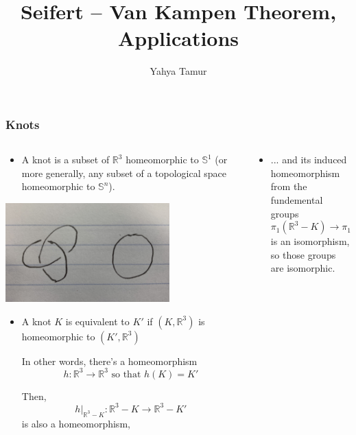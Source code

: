 \documentclass[8pt]{beamer}
\title{Seifert -- Van Kampen Theorem, Applications}
\author{Yahya Tamur}
\begin{document}
  \frame{\titlepage}

  \begin{frame}
    \frametitle{Knots}
    \begin{columns}
      \begin{column}{0.5\textwidth}
        \begin{itemize}
          \item
            A knot is a subset of $\mathbb{R}^3$ homeomorphic to $\mathbb{S}^1$
            (or more generally, any subset of a topological space homeomorphic
            to $\mathbb{S}^n$).
        \end{itemize}

        \begin{center}
        \includegraphics[width=0.7\textwidth]{img/knots.JPG}
        \end{center}

        \begin{itemize}
          \item
            A knot $K$ is equivalent to $K'$ if
            $(K, \mathbb{R}^3)$ is homeomorphic to $(K', \mathbb{R}^3)$

            In other words, there's a homeomorphism
            \[h : \mathbb{R}^3 \rightarrow \mathbb{R}^3 \text{ so that }
            h(K) = K'\]

            Then,
            \[h|_{\mathbb{R}^3-K} : \mathbb{R}^3-K \rightarrow \mathbb{R}^3-K'\]
            is also a homeomorphism,
        \end{itemize}
      \end{column}


      \begin{column}{0.5\textwidth}
        \begin{itemize}
          \item
            ... and its induced homeomorphism from the fundemental groups
            \[\pi_1(\mathbb{R}^3-K) \rightarrow \pi_1(\mathbb{R}^3-K')\]
            is an isomorphism, so those groups are isomorphic.


\end{itemize}
\end{column}
\end{columns}
\end{frame}
\end{document}
